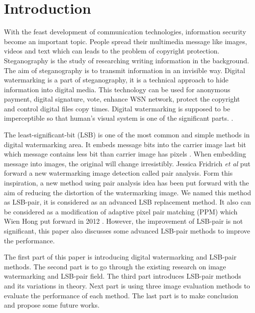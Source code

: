 \documentclass[%
    reprint,
    amsmath,amssymb,
    aps,
   ]{revtex4-1}
\begin{document}
   
   
   
   
   \maketitle
   
   \section{\label{sec:level1}Introduction}
   
   With the feast development of communication technologies, information security become an important topic. People spread their multimedia message like images, videos and text which can leads to the problem of copyright protection. Steganography is the study of researching writing information in the background. The aim of steganography is to transmit information in an invisible way. Digital watermarking is a part of steganography, it is a technical approach to hide information into digital media. This technology can be used for anonymous payment, digital signature, vote, enhance WSN network, protect the copyright and control digital files copy times. Digital watermarking is supposed to be imperceptible \cite{chen2001quantization} so that human’s visual system is one of the significant parts.  \cite{ker2004improved}. 
   
   The least-significant-bit (LSB) is one of the most common and simple methods in digital watermarking area. It embeds message bits into the carrier image last bit which message contains less bit than carrier image has pixels \cite{ker2004improved}\cite{kaur2013image}. When embedding message into images, the original will change irresistibly. Jessica Fridrich  \textit{et al} \cite{fridrich2003higher} put forward a new watermarking image detection called pair analysis. Form this inspiration, a new method using pair analysis idea has been put forward with the aim of reducing the distortion of the watermarking image. We named this method as LSB-pair, it is considered as an advanced LSB replacement method. It also can be considered as a modification of adaptive pixel pair matching (PPM) which Wien Hong put forward in 2012 \cite{hong2012novel}.  However, the improvement of LSB-pair is not significant, this paper also discusses some advanced LSB-pair methods to improve the performance.
   
   The first part of this paper is introducing digital watermarking and LSB-pair methods. The second part is to go through the existing research on image watermarking and LSB-pair field. The third part introduces LSB-pair methods and its variations in theory. Next part is using three image evaluation methods to evaluate the performance of each method. The last part is to make conclusion and propose some future works.
   
\end{document}
